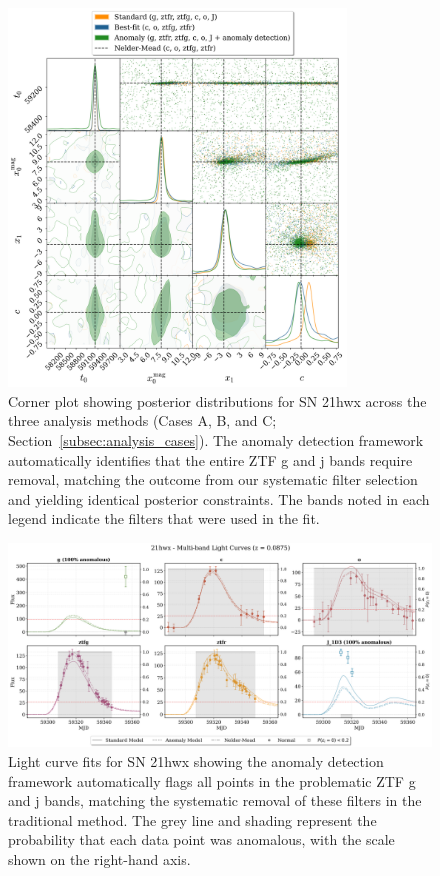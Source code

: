 \begin{figure}
\centering
\includegraphics[width=0.8\textwidth]{images/corner_comparison_21hwx_paper_quality.png}
\caption{Corner plot showing posterior distributions for SN 21hwx across the three analysis methods (Cases A, B, and C; Section~\ref{subsec:analysis_cases}). The anomaly detection framework automatically identifies that the entire ZTF g and j bands require removal, matching the outcome from our systematic filter selection and yielding identical posterior constraints. The bands noted in each legend indicate the filters that were used in the fit.}
\label{fig:21hwx_corner}
\end{figure}

\begin{figure}
\centering
\includegraphics[width=\textwidth]{images/21hwx_light_curves_all_paper.png}
\caption{Light curve fits for SN 21hwx showing the anomaly detection framework automatically flags all points in the problematic ZTF g and j bands, matching the systematic removal of these filters in the traditional method. The grey line and shading represent the probability that each data point was anomalous, with the scale shown on the right-hand axis.}
\label{fig:21hwx_lightcurves}
\end{figure}

